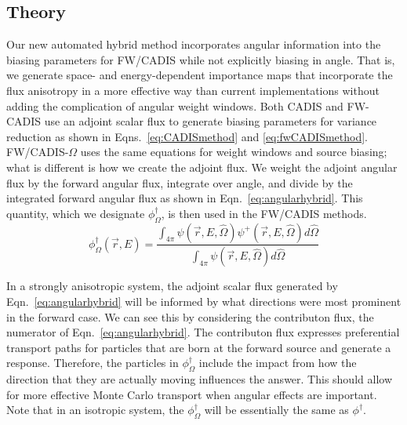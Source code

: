 \documentclass[12pt]{article}
\begin{document}
\subsection{Theory}
\label{subsect::theory}

Our new automated hybrid method incorporates angular information into the biasing parameters for FW/CADIS while not explicitly biasing in angle. 
That is, we generate space- and energy-dependent importance maps that incorporate the flux anisotropy in a more effective way than current implementations without adding the complication of angular weight windows. 
Both CADIS and FW-CADIS use an adjoint scalar flux to generate biasing parameters for variance reduction as shown in Eqns.~\eqref{eq:CADISmethod} and \eqref{eq:fwCADISmethod}. 
FW/CADIS-$\Omega$ uses the same equations for weight windows and source biasing; what is different is how we create the adjoint flux. 
We weight the adjoint angular flux by the forward angular flux, integrate over angle, and divide by the integrated forward angular flux as shown in Eqn.~\eqref{eq:angularhybrid}.
This quantity, which we designate $\phi^{\dagger}_{\Omega}$, is then used in the FW/CADIS methods.
%
\begin{equation} 
\phi^{\dagger}_{\Omega}(\vec{r},E) = \frac{\int_{4\pi} \psi(\vec {r} ,E,\hat{\Omega})\psi^+(\vec {r} ,E,\hat{\Omega})d\hat\Omega }{\int_{4\pi}\psi(\vec {r} ,E,\hat{\Omega})d\hat\Omega}
\label{eq:angularhybrid}
\end{equation}

In a strongly anisotropic system, the adjoint scalar flux generated by Eqn.~\eqref{eq:angularhybrid} will be informed by what directions were most prominent in the forward case. 
We can see this by considering the contributon flux, the numerator of Eqn.~\eqref{eq:angularhybrid}.
The contributon flux expresses preferential transport paths for particles that are born at the forward source and generate a response.
Therefore, the particles in $\phi^{\dagger}_{\Omega}$ include the impact from how the direction that they are actually moving influences the answer. 
This should allow for more effective Monte Carlo transport when angular effects are important. 
Note that in an isotropic system, the $\phi^{\dagger}_{\Omega}$ will be essentially the same as $\phi^{\dagger}$. 

\end{document}
